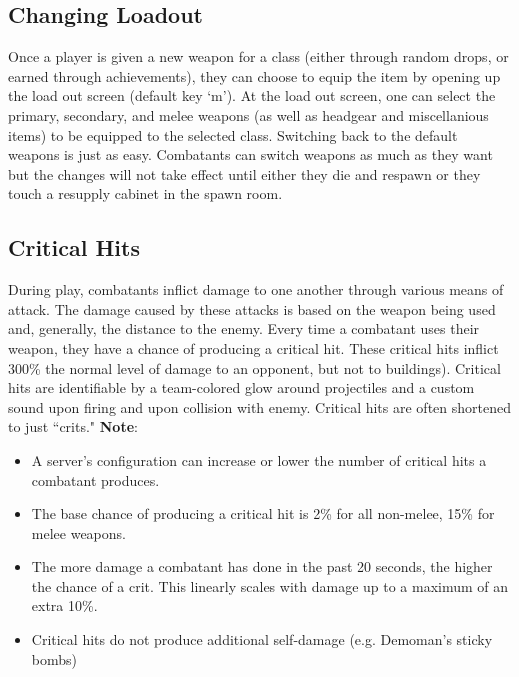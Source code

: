 \subsection{Changing Loadout}
Once a player is given a new weapon for a class (either through random drops, or earned through achievements), they can choose to equip the item by opening up the load out screen (default key `m'). At the load out screen, one can select the primary, secondary, and melee weapons (as well as headgear and miscellanious items) to be equipped to the selected class.  Switching back to the default weapons is just as easy. Combatants can switch weapons as much as they want but the changes will not take effect until either they die and respawn or they touch a resupply cabinet in the spawn room.

\subsection{Critical Hits}
During play, combatants inflict damage to one another through various means of attack.  The damage caused by these attacks is based on the weapon being used and, generally, the distance to the enemy.  Every time a combatant uses their weapon, they have a chance of producing a critical hit.  These critical hits inflict 300\% the normal level of damage to an opponent, but not to buildings). Critical hits are identifiable by a team-colored glow around projectiles and a custom sound upon firing and upon collision with enemy.  Critical hits are often shortened to just ``crits."
\newpage
{\bf Note}:
\begin{itemize}
	\item A server's configuration can increase or lower the number of critical hits a combatant produces. 
	\item The base chance of producing a critical hit is 2\% for all non-melee, 15\% for melee weapons.
	\item The more damage a combatant has done in the past 20 seconds, the higher the chance of a crit. This linearly scales with damage up to a maximum of an extra 10\%. 
	\item Critical hits do not produce additional self-damage (e.g. Demoman's sticky bombs)
\end{itemize}

